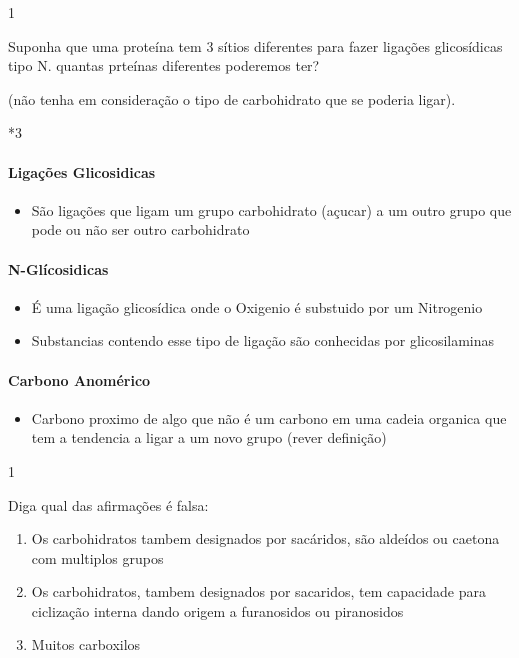\documentclass[\mainfilename]{subfiles}
\begin{document}
\begin{questionBox}1{}
    
    Suponha que uma proteína tem 3 sítios diferentes para fazer ligações glicosídicas tipo N. quantas prteínas diferentes poderemos ter?
    
    (não tenha em consideração o tipo de carbohidrato que se poderia ligar).

    \begin{questionBox}*3{}

        \paragraph{Ligações Glicosidicas}
        \begin{itemize}
            \item São ligações que ligam um grupo carbohidrato (açucar) a um outro grupo que pode ou não ser outro carbohidrato
        \end{itemize}
        
        \paragraph{N-Glícosidicas}
        \begin{itemize}
            \item É uma ligação glicosídica onde o Oxigenio é substuido por um Nitrogenio
            \item Substancias contendo esse tipo de ligação são conhecidas por glicosilaminas
        \end{itemize}

        \paragraph{Carbono Anomérico}
        \begin{itemize}
            \item Carbono proximo de algo que não é um carbono em uma cadeia organica que tem a tendencia a ligar a um novo grupo (rever definição)
        \end{itemize}
        
    \end{questionBox}
    
\end{questionBox}

\begin{questionBox}1{}
    
    Diga qual das afirmações é falsa:
    \begin{enumerate}
        \item Os carbohidratos tambem designados por sacáridos, são aldeídos ou caetona com multiplos grupos 
        \item Os carbohidratos, tambem designados por sacaridos, tem capacidade para ciclização interna dando origem a furanosidos ou piranosidos
        \item Muitos carboxilos 
    \end{enumerate}
    
\end{questionBox}
\end{document}
